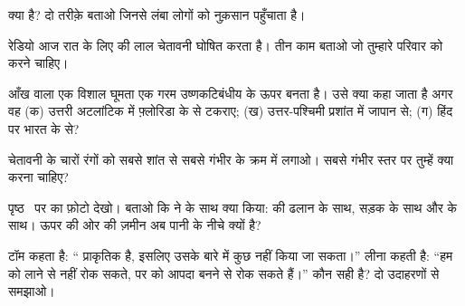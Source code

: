 \begin{exercise}[$\star$]\label{exo:g5:natural-hazards:3}
 क्या है? दो तरीक़े बताओ जिनसे लंबा  लोगों को नुक़सान पहुँचाता है।
\end{exercise}

\begin{exercise}[$\star$]\label{exo:g5:natural-hazards:4}
रेडियो आज रात के लिए  की लाल चेतावनी घोषित करता है। तीन काम बताओ जो तुम्हारे
परिवार को करने चाहिए।
\end{exercise}

\begin{exercise}[$\star$]\label{exo:g5:natural-hazards:5}
आँख वाला एक विशाल घूमता  एक गरम उष्णकटिबंधीय  के ऊपर बनता है। उसे क्या
कहा जाता है अगर वह (क) उत्तरी अटलांटिक में फ़्लोरिडा के  से टकराए;
(ख) उत्तर-पश्चिमी प्रशांत में जापान से; (ग) हिंद  पर भारत के
 से?
\end{exercise}

\begin{exercise}[$\star$]\label{exo:g5:natural-hazards:6}
चेतावनी के चारों रंगों को सबसे शांत से सबसे गंभीर के क्रम में लगाओ। सबसे गंभीर
स्तर पर तुम्हें क्या करना चाहिए?
\end{exercise}

\begin{exercise}[$\star\star$]\label{exo:g5:natural-hazards:7}
पृष्ठ~\pageref{fig:g5:natural-hazards:landslide} पर  का फ़ोटो
देखो। बताओ कि  ने  के साथ क्या किया:  की ढलान के साथ, सड़क के
साथ और  के साथ। ऊपर की ओर की ज़मीन अब पानी के नीचे क्यों है?
\end{exercise}

\begin{exercise}[$\star\star$]\label{exo:g5:natural-hazards:8}
टॉम कहता है: `` प्राकृतिक है, इसलिए उसके बारे में कुछ नहीं किया जा सकता।'' लीना
कहती है: ``हम  को  लाने से नहीं रोक सकते, पर  को आपदा बनने से रोक सकते
हैं।'' कौन सही है? दो उदाहरणों से समझाओ।
\end{exercise}

